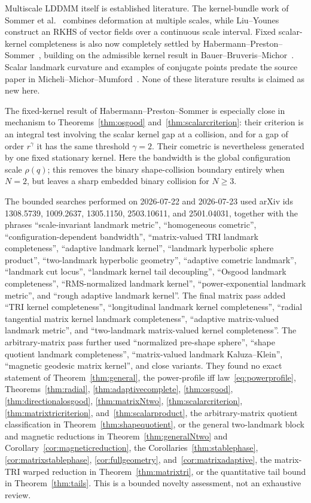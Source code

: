 \documentclass[11pt]{article}
\begin{document}
Multiscale LDDMM itself is established literature.  The kernel-bundle work of
Sommer et al.~\cite{SLNP} combines deformation at multiple scales, while
Liu--Younes~\cite{LY} construct an RKHS of vector fields over a continuous
scale interval.  Fixed scalar-kernel completeness is also now completely
settled by Habermann--Preston--Sommer~\cite{HPS}, building on the admissible
kernel result in Bauer--Bruveris--Michor~\cite{BBM}.  Scalar landmark
curvature and examples of conjugate points predate the source paper in
Micheli--Michor--Mumford~\cite{MMM}.  None of these literature results is
claimed as new here.

The fixed-kernel result of Habermann--Preston--Sommer is especially close
in mechanism to Theorems~\ref{thm:osgood}
and~\ref{thm:scalarcriterion}: their
criterion is an integral test involving the scalar kernel gap at a
collision, and for a gap of order \(r^\gamma\) it has the same threshold
\(\gamma=2\).  Their cometric is nevertheless generated by one fixed
stationary kernel.  Here the bandwidth is the global configuration scale
\(\rho(q)\); this removes the binary shape-collision boundary entirely when
\(N=2\), but leaves a sharp embedded binary collision for \(N\ge3\).

The bounded searches performed on 2026-07-22 and 2026-07-23 used arXiv ids
1308.5739, 1009.2637, 1305.1150, 2503.10611, and 2501.04031, together with
the phrases ``scale-invariant landmark metric'', ``homogeneous cometric'',
``configuration-dependent bandwidth'', ``matrix-valued TRI landmark
completeness'', ``adaptive landmark kernel'', ``landmark hyperbolic sphere
product'', ``two-landmark hyperbolic geometry'', ``adaptive cometric
landmark'', ``landmark cut locus'', ``landmark kernel tail decoupling'',
``Osgood landmark completeness'', ``RMS-normalized landmark kernel'',
``power-exponential landmark metric'', and ``rough adaptive landmark
kernel''.  The final matrix pass added ``TRI kernel completeness'',
``longitudinal landmark kernel completeness'', ``radial tangential matrix
kernel landmark completeness'', ``adaptive matrix-valued landmark metric'',
and ``two-landmark matrix-valued kernel completeness''.
The arbitrary-matrix pass further used ``normalized pre-shape sphere'',
``shape quotient landmark completeness'', ``matrix-valued landmark
Kaluza--Klein'', ``magnetic geodesic matrix kernel'', and close variants.
They found no exact statement of Theorem~\ref{thm:general}, the power-profile
iff law~\eqref{eq:powerprofile}, Theorems~\ref{thm:radial},
\ref{thm:adaptivecomplete}, \ref{thm:osgood},
\ref{thm:directionalosgood}, \ref{thm:matrixNtwo},
\ref{thm:scalarcriterion}, \ref{thm:matrixtricriterion},
and~\ref{thm:scalarproduct}, the arbitrary-matrix quotient classification
in Theorem~\ref{thm:shapequotient}, or the general two-landmark block and
magnetic reductions in Theorem~\ref{thm:generalNtwo} and
Corollary~\ref{cor:magneticreduction}, the
Corollaries~\ref{thm:stablephase}, \ref{cor:matrixstablephase},
\ref{cor:fullgeometry},
and~\ref{cor:matrixadaptive}, the
matrix-TRI warped reduction in Theorem~\ref{thm:matrixtri}, or the
quantitative tail bound in Theorem~\ref{thm:tails}.  This is a bounded
novelty assessment, not an exhaustive review.
\end{document}
